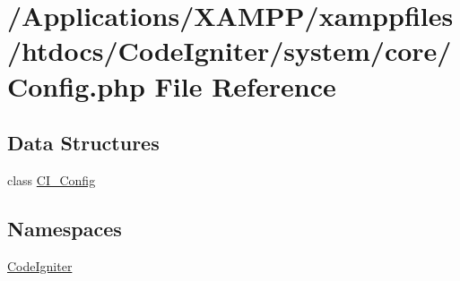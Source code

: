 \hypertarget{system_2core_2config_8php}{}\section{/\+Applications/\+X\+A\+M\+P\+P/xamppfiles/htdocs/\+Code\+Igniter/system/core/\+Config.php File Reference}
\label{system_2core_2config_8php}
\subsection*{Data Structures}
\begin{DoxyCompactItemize}
\item 
class \mbox{\hyperlink{class_c_i___config}{C\+I\+\_\+\+Config}}
\end{DoxyCompactItemize}
\subsection*{Namespaces}
\begin{DoxyCompactItemize}
\item 
 \mbox{\hyperlink{namespace_code_igniter}{Code\+Igniter}}
\end{DoxyCompactItemize}

